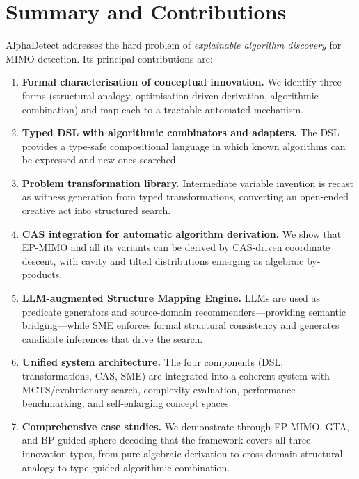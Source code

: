 \documentclass[12pt,a4paper]{article}
\begin{document}
\section{Summary and Contributions}
\label{sec:summary}

AlphaDetect addresses the hard problem of \emph{explainable algorithm discovery}
for MIMO detection.  Its principal contributions are:

\begin{enumerate}[leftmargin=2em, itemsep=4pt]
  \item \textbf{Formal characterisation of conceptual innovation.}  We identify
        three forms (structural analogy, optimisation-driven derivation,
        algorithmic combination) and map each to a tractable automated mechanism.

  \item \textbf{Typed DSL with algorithmic combinators and adapters.}  The DSL
        provides a type-safe compositional language in which known algorithms
        can be expressed and new ones searched.

  \item \textbf{Problem transformation library.}  Intermediate variable
        invention is recast as witness generation from typed transformations,
        converting an open-ended creative act into structured search.

  \item \textbf{CAS integration for automatic algorithm derivation.}  We show
        that EP-MIMO and all its variants can be derived by CAS-driven
        coordinate descent, with cavity and tilted distributions emerging as
        algebraic by-products.

  \item \textbf{LLM-augmented Structure Mapping Engine.}  LLMs are used as
        predicate generators and source-domain recommenders---providing semantic
        bridging---while SME enforces formal structural consistency and
        generates candidate inferences that drive the search.

  \item \textbf{Unified system architecture.}  The four components
        (DSL, transformations, CAS, SME) are integrated into a coherent
        system with MCTS/evolutionary search, complexity evaluation,
        performance benchmarking, and self-enlarging concept spaces.

  \item \textbf{Comprehensive case studies.}  We demonstrate through EP-MIMO,
        GTA, and BP-guided sphere decoding that the framework covers all three
        innovation types, from pure algebraic derivation to cross-domain
        structural analogy to type-guided algorithmic combination.
\end{enumerate}
\end{document}
